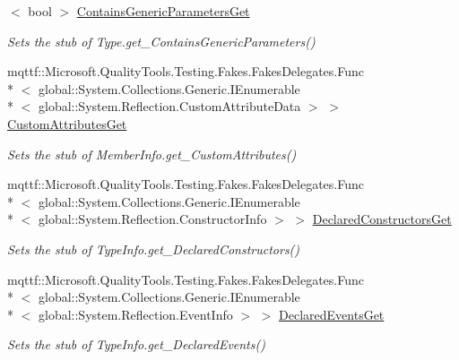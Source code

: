 \begin{DoxyCompactItemize}
$<$ bool $>$ \hyperlink{class_system_1_1_reflection_1_1_fakes_1_1_stub_type_delegator_a98d8fe5729f4bcf62868be21e32b409b}{Contains\-Generic\-Parameters\-Get}
\begin{DoxyCompactList}\small\item\em Sets the stub of Type.\-get\-\_\-\-Contains\-Generic\-Parameters()\end{DoxyCompactList}\item 
mqttf\-::\-Microsoft.\-Quality\-Tools.\-Testing.\-Fakes.\-Fakes\-Delegates.\-Func\\*
$<$ global\-::\-System.\-Collections.\-Generic.\-I\-Enumerable\\*
$<$ global\-::\-System.\-Reflection.\-Custom\-Attribute\-Data $>$ $>$ \hyperlink{class_system_1_1_reflection_1_1_fakes_1_1_stub_type_delegator_a2564db468a8a46d4b58800bebce3f524}{Custom\-Attributes\-Get}
\begin{DoxyCompactList}\small\item\em Sets the stub of Member\-Info.\-get\-\_\-\-Custom\-Attributes()\end{DoxyCompactList}\item 
mqttf\-::\-Microsoft.\-Quality\-Tools.\-Testing.\-Fakes.\-Fakes\-Delegates.\-Func\\*
$<$ global\-::\-System.\-Collections.\-Generic.\-I\-Enumerable\\*
$<$ global\-::\-System.\-Reflection.\-Constructor\-Info $>$ $>$ \hyperlink{class_system_1_1_reflection_1_1_fakes_1_1_stub_type_delegator_ae98b96bcb5c23222fd320353152def86}{Declared\-Constructors\-Get}
\begin{DoxyCompactList}\small\item\em Sets the stub of Type\-Info.\-get\-\_\-\-Declared\-Constructors()\end{DoxyCompactList}\item 
mqttf\-::\-Microsoft.\-Quality\-Tools.\-Testing.\-Fakes.\-Fakes\-Delegates.\-Func\\*
$<$ global\-::\-System.\-Collections.\-Generic.\-I\-Enumerable\\*
$<$ global\-::\-System.\-Reflection.\-Event\-Info $>$ $>$ \hyperlink{class_system_1_1_reflection_1_1_fakes_1_1_stub_type_delegator_a379f761b749148ad270cdd878c4ce0a6}{Declared\-Events\-Get}
\begin{DoxyCompactList}\small\item\em Sets the stub of Type\-Info.\-get\-\_\-\-Declared\-Events()\end{DoxyCompactList}\item 

\end{DoxyCompactItemize}
